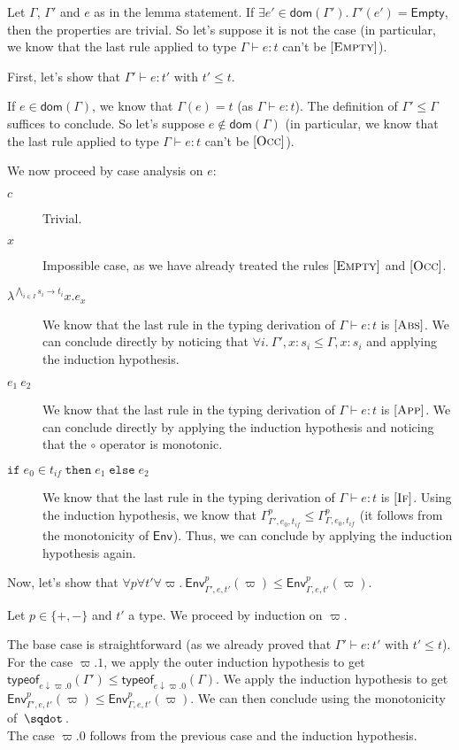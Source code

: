 \documentclass[a4paper]{article}%
\newcommand{\worra}[2]{#1\mathop{\,\sqdot\,} #2}
\newcommand{\dom}[1]{\textsf{dom}(#1)}
\newcommand{\Empty} {\textsf{Empty}}%
\newcommand{\ite}[4]{\ensuremath{\texttt{if}\;#1\in#2\;\texttt{then}\;#3\;\texttt{else}\;#4}}
\newcommand{\tyof}[2]{\textsf{typeof}_{#2}(#1)}
\newcommand{\Gp}[2]{\textsf{Env}^{#1}_{#2}}
\theoremstyle{definition}
\newcommand {\Rule}[1] {[\textsc{#1}]}
\begin{document}
    Let $\Gamma$, $\Gamma'$ and $e$ as in the lemma statement.
    If $\exists e' \in \dom {\Gamma'}.\ \Gamma'(e') = \Empty$, then the properties are trivial.
    So let's suppose it is not the case (in particular, we know that the last rule applied to type $\Gamma \vdash e:t$ can't be $\Rule{Empty}$).

    First, let's show that $\Gamma' \vdash e:t' \text{ with } t' \leq t$.

    If $e\in\dom\Gamma$, we know that $\Gamma(e)=t$ (as $\Gamma \vdash e:t$). The definition of $\Gamma' \leq \Gamma$ suffices to conclude.
    So let's suppose $e\not\in\dom\Gamma$ (in particular, we know that the last rule applied to type $\Gamma \vdash e:t$ can't be $\Rule{Occ}$).

    We now proceed by case analysis on $e$:
    \begin{description}
      \item[$c$] Trivial.
      \item[$x$] Impossible case, as we have already treated the rules $\Rule{Empty}$ and $\Rule{Occ}$.
      \item[$\lambda^{\bigwedge_{i\in I} s_i \rightarrow t_i}x.e_x$] We know that the last rule in the typing derivation of $\Gamma \vdash e:t$ is $\Rule {Abs}$.
      We can conclude directly by noticing that $\forall i.\ \Gamma',x:s_i \leq \Gamma,x:s_i$ and applying the induction hypothesis.
      \item[$e_1\ e_2$] We know that the last rule in the typing derivation of $\Gamma \vdash e:t$ is $\Rule {App}$.
      We can conclude directly by applying the induction hypothesis and noticing that the $\circ$ operator is monotonic.
      \item[$\ite {e_0} {t_{if}} {e_1} {e_2}$] We know that the last rule in the typing derivation of $\Gamma \vdash e:t$ is $\Rule {If}$.
      Using the induction hypothesis, we know that $\Gamma^p_{\Gamma',e_0,t_{if}} \leq \Gamma^p_{\Gamma,e_0,t_{if}}$ (it follows from the monotonicity of $\Gp {} {}$).
      Thus, we can conclude by applying the induction hypothesis again.\\
    \end{description}

    Now, let's show that $\forall p \forall t' \forall \varpi.\ \Gp p {\Gamma',e,t'} (\varpi) \leq \Gp p {\Gamma,e,t'} (\varpi)$.

    Let $p\in \{+,-\}$ and $t'$ a type.
    We proceed by induction on $\varpi$.
    
    The base case is straightforward (as we already proved that $\Gamma' \vdash e:t' \text{ with } t' \leq t$).\\
    For the case $\varpi.1$, we apply the outer induction hypothesis to get $\tyof {\Gamma'} {e\downarrow\varpi.0} \leq \tyof {\Gamma} {e\downarrow\varpi.0}$.
    We apply the induction hypothesis to get $\Gp p {\Gamma',e,t'} (\varpi) \leq \Gp p {\Gamma,e,t'} (\varpi)$. We can then conclude using the monotonicity of $\worra {} {}$.\\
    The case $\varpi.0$ follows from the previous case and the induction hypothesis.
\end{document}
